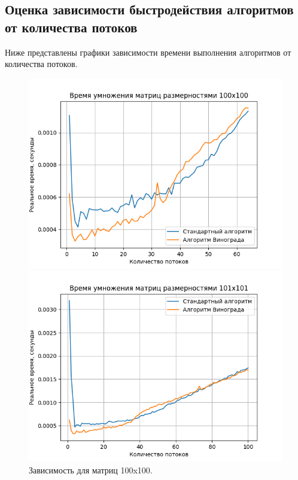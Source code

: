 \documentclass[a4paper,12pt]{article}
\begin{document}
\subsection{Оценка зависимости быстродействия алгоритмов от количества потоков}
Ниже представлены графики зависимости времени выполнения алгоритмов от количества потоков.
\begin{figure}[h]
\begin{center}
\begin{minipage}[H]{0.48\linewidth}
\includegraphics[width=1\linewidth]{100x100.png}
\caption{Зависимость для матриц 100x100.}
\label{ris:experimoriginal}
\end{minipage}
\hfill
\begin{minipage}[H]{0.48\linewidth}
\includegraphics[width=1\linewidth]{101x101.png}

\end{minipage}
\end{center}
\end{figure}
\end{document}
